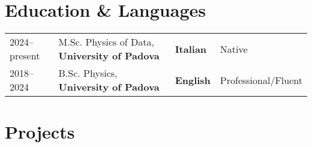 \documentclass[a4paper,10pt]{article}
\begin{document}
\section{Education \& Languages}
\begin{tabularx}{\linewidth}{@{}l X l X@{}}
2024--present & M.Sc. Physics of Data, \textbf{University of Padova} & \hfill \textbf{Italian} & Native \\
2018--2024 & B.Sc. Physics, \textbf{University of Padova} & \hfill \textbf{English} & Professional/Fluent \\
\end{tabularx}

\section{Projects}
\end{document}
